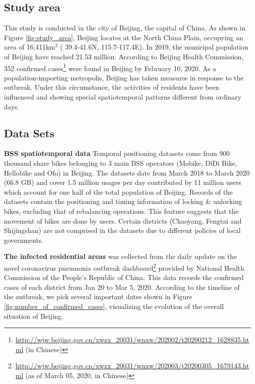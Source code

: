 \documentclass[preprints,ijgi,submit,moreauthors]{Definitions/mdpi}
\begin{document}
\subsection{Study area}
This study is conducted in the city of Beijing, the capital of China. 
As shown in Figure \ref{fig:study_area}, Beijing locates at the North China Plain, occupying an area of 16,411km$^2$ ( 39.4{\degree}-41.6{\degree}N, 115.7{\degree}-117.4{\degree}E). 
In 2019, the municipal population of Beijing have reached 21.53 million. According to Beijing Health Commission, 352 confirmed cases\footnote{\url{http://wjw.beijing.gov.cn/xwzx_20031/wnxw/202002/t20200212_1628835.html} (in Chinese)} were found in Beijing by February 10, 2020. 
As a population-importing metropolis, Beijing has taken measures in response to the outbreak. 
Under this circumstance, the activities of residents have been influenced and showing special spatiotemporal patterns different from ordinary days.

\subsection{Data Sets}
\textbf{BSS spatiotemporal data} Temporal positioning datasets come from 900 thousand share bikes belonging to 3 main BSS operators (Mobike, DiDi Bike, Hellobike and Ofo) in Beijing.
The datasets date from March 2018 to March 2020 (66.8 GB) and cover 1.5 million usages per day contributed by 11 million users which account for one half of the total population of Beijing.
Records of the datasets contain the positioning and timing information of locking \& unlocking bikes, excluding that of rebalancing operations.
This feature suggests that the movement of bikes are done by users.
Certain districts (Chaoyang, Fengtai and Shijingshan) are not comprised in the datasets due to different policies of local governments.

\textbf{The infected residential areas} was collected from the daily update on the novel coronavirus pneumonia outbreak dashboard\footnote{\url{http://wjw.beijing.gov.cn/xwzx_20031/wnxw/202003/t20200305_1679143.html} (as of March 05, 2020, in Chinese)} provided by National Health Commission of the People's Republic of China. 
This data records the confirmed cases of each district from Jan 20 to Mar 5, 2020. 
According to the timeline \cite{li2020early} of the outbreak, we pick several important dates shown in Figure \ref{fig:number_of_confirmed_cases}, visualizing the evolution of the overall situation of Beijing.
\end{document}
